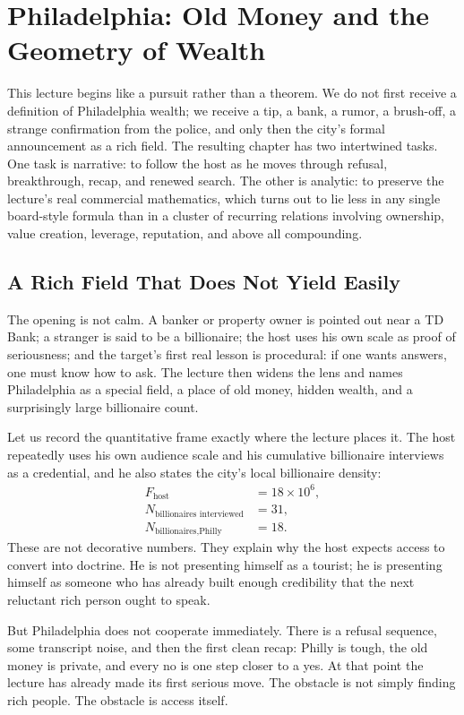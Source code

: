 \chapter{Philadelphia: Old Money and the Geometry of Wealth}

This lecture begins like a pursuit rather than a theorem. We do not first receive a definition of Philadelphia wealth; we receive a tip, a bank, a rumor, a brush-off, a strange confirmation from the police, and only then the city's formal announcement as a rich field. The resulting chapter has two intertwined tasks. One task is narrative: to follow the host as he moves through refusal, breakthrough, recap, and renewed search. The other is analytic: to preserve the lecture's real commercial mathematics, which turns out to lie less in any single board-style formula than in a cluster of recurring relations involving ownership, value creation, leverage, reputation, and above all compounding.

\section{A Rich Field That Does Not Yield Easily}

The opening is not calm. A banker or property owner is pointed out near a TD Bank; a stranger is said to be a billionaire; the host uses his own scale as proof of seriousness; and the target's first real lesson is procedural: if one wants answers, one must know how to ask. The lecture then widens the lens and names Philadelphia as a special field, a place of old money, hidden wealth, and a surprisingly large billionaire count.

Let us record the quantitative frame exactly where the lecture places it. The host repeatedly uses his own audience scale and his cumulative billionaire interviews as a credential, and he also states the city's local billionaire density:
\begin{align}
F_{\text{host}} &= 18 \times 10^6,\\
N_{\text{billionaires interviewed}} &= 31,\\
N_{\text{billionaires,Philly}} &= 18.
\end{align}
These are not decorative numbers. They explain why the host expects access to convert into doctrine. He is not presenting himself as a tourist; he is presenting himself as someone who has already built enough credibility that the next reluctant rich person ought to speak.

But Philadelphia does not cooperate immediately. There is a refusal sequence, some transcript noise, and then the first clean recap: Philly is tough, the old money is private, and every no is one step closer to a yes. At that point the lecture has already made its first serious move. The obstacle is not simply finding rich people. The obstacle is access itself.

